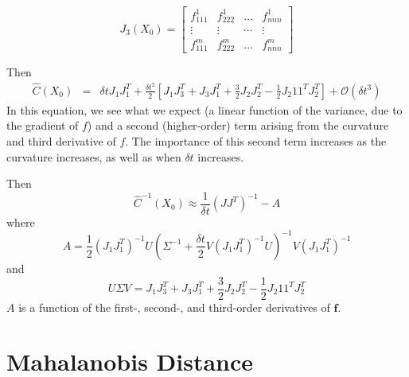 \documentclass[12pt]{article}
\begin{document}
\begin{equation}
J_3(X_0) = \begin{bmatrix}
f_{111}^1 & f_{222}^1 & \dots & f_{nnn}^1 \\
\vdots & \vdots & \cdots & \vdots \\
f_{111}^m & f_{222}^m & \dots & f_{nnn}^m
\end{bmatrix}
\end{equation}

Then
\begin{eqnarray}
\hat{C}(X_0) &=& \delta t J_1 J_1^T 
+ \frac{\delta t^2}{2} \left[ J_1 J_3^T + J_3 J_1^T  
+ \frac{3}{2} J_2 J_2^T 
-\frac{1 }{2} J_2 1 1^T J_2^T \right]
+ \mathcal{O} (\delta t^3) %
\end{eqnarray}
%
In this equation, we see what we expect (a linear function of the variance, due to the gradient of $f$) and a second (higher-order) term arising from the curvature and third derivative of $f$.
%
The importance of this second term increases as the curvature increases, as well as when $\delta t$ increases. 



Then
\begin{equation}
\hat{C}^{-1}(X_0) \approx \frac{1}{\delta t} \left( J J^T \right)^{-1} - A
\end{equation}
%
where 
\begin{equation}
A = \frac{1}{2} (J_1 J_1^T)^{-1} U \left(\Sigma^{-1} + \frac{\delta t}{2} V \left( J_1 J_1^T \right)^{-1} U \right)^{-1} V \left( J_1 J_1^T \right)^{-1}
\end{equation}
and
\begin{equation}
U \Sigma V = J_1 J_3^T + J_3 J_1^T + \frac{3}{2} J_2 J_2^T -\frac{1 }{2} J_2 1 1^T J_2^T 
\end{equation}
$A$ is a function of the first-, second-, and third-order derivatives of $\mathbf{f}$.

\section{Mahalanobis Distance}
\end{document}
